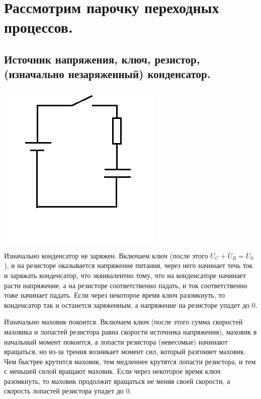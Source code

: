 \documentclass[11pt]{article} %
\begin{document}
\section{Рассмотрим парочку переходных процессов.}

\subsection{Источник напряжения, ключ, резистор, (изначально незаряженный) конденсатор.}

\includegraphics{../RC.png}

Изначально конденсатор не заряжен.
Включаем ключ (после этого $U_C+U_R=U_0$), и на резисторе оказывается напряжение питания, через него начинает течь ток и заряжать конденсатор, что эквивалентно тому, что на конденсаторе начинает расти напряжение, а на резисторе соответственно падать, и ток соответственно тоже начинает падать. Если через некоторое время ключ разомкнуть, то конденсатор так и останется заряженным, а напряжение на резисторе упадет до 0.

Изначально маховик покоится.
Включаем ключ (после этого сумма скоростей маховика и лопастей резистора равна скорости источника напряжения), маховик в начальный момент покоится, а лопасти резистора (невесомые) начинают вращаться, но из-за трения возникает момент сил, который разгоняет маховик. Чем быстрее крутится маховик, тем медленнее крутятся лопасти резистора, и тем с меньшей силой вращают маховик. Если через некоторое время ключ разомкнуть, то маховик продолжит вращаться не меняя своей скорости, а скорость лопастей резистора упадет до 0.
\end{document}
